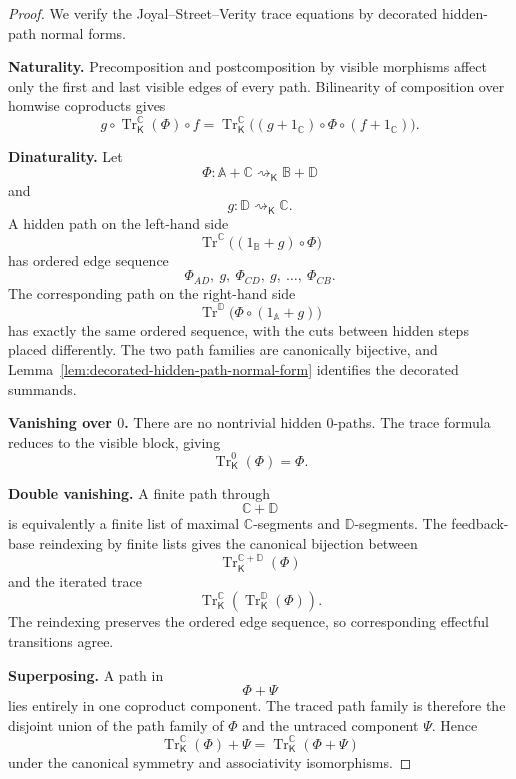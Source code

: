 \begin{proof}
We verify the Joyal--Street--Verity trace equations by decorated hidden-path
normal forms.

\textbf{Naturality.}
Precomposition and postcomposition by visible morphisms affect only the
first and last visible edges of every path.  Bilinearity of composition over
homwise coproducts gives
\[
    g\circ
    \operatorname{Tr}^{\mathbb C}_{\mathsf K}(\Phi)
    \circ f
    =
    \operatorname{Tr}^{\mathbb C}_{\mathsf K}
    \bigl(
        (g+1_{\mathbb C})
        \circ
        \Phi
        \circ
        (f+1_{\mathbb C})
    \bigr).
\]

\textbf{Dinaturality.}
Let
\[
    \Phi:
    \mathbb A+\mathbb C
    \rightsquigarrow_{\mathsf K}
    \mathbb B+\mathbb D
\]
and
\[
    g:\mathbb D\rightsquigarrow_{\mathsf K}\mathbb C.
\]
A hidden path on the left-hand side
\[
    \operatorname{Tr}^{\mathbb C}
    \bigl(
        (1_{\mathbb B}+g)\circ\Phi
    \bigr)
\]
has ordered edge sequence
\[
    \Phi_{AD},
    \ g,
    \ \Phi_{CD},
    \ g,
    \ \ldots,
    \ \Phi_{CB}.
\]
The corresponding path on the right-hand side
\[
    \operatorname{Tr}^{\mathbb D}
    \bigl(
        \Phi\circ(1_{\mathbb A}+g)
    \bigr)
\]
has exactly the same ordered sequence, with the cuts between hidden steps
placed differently.  The two path families are canonically bijective, and
Lemma~\ref{lem:decorated-hidden-path-normal-form} identifies the decorated
summands.

\textbf{Vanishing over \(0\).}
There are no nontrivial hidden \(0\)-paths.  The trace formula reduces to the
visible block, giving
\[
    \operatorname{Tr}^{0}_{\mathsf K}(\Phi)
    =
    \Phi.
\]

\textbf{Double vanishing.}
A finite path through
\[
    \mathbb C+\mathbb D
\]
is equivalently a finite list of maximal \(\mathbb C\)-segments and
\(\mathbb D\)-segments.  The feedback-base reindexing by finite lists gives
the canonical bijection between
\[
    \operatorname{Tr}^{\mathbb C+\mathbb D}_{\mathsf K}(\Phi)
\]
and the iterated trace
\[
    \operatorname{Tr}^{\mathbb C}_{\mathsf K}
    \left(
        \operatorname{Tr}^{\mathbb D}_{\mathsf K}(\Phi)
    \right).
\]
The reindexing preserves the ordered edge sequence, so corresponding
effectful transitions agree.

\textbf{Superposing.}
A path in
\[
    \Phi+\Psi
\]
lies entirely in one coproduct component.  The traced path family is
therefore the disjoint union of the path family of \(\Phi\) and the
untraced component \(\Psi\).  Hence
\[
    \operatorname{Tr}^{\mathbb C}_{\mathsf K}(\Phi)
    +
    \Psi
    =
    \operatorname{Tr}^{\mathbb C}_{\mathsf K}
    (\Phi+\Psi)
\]
under the canonical symmetry and associativity isomorphisms.


\end{proof}
